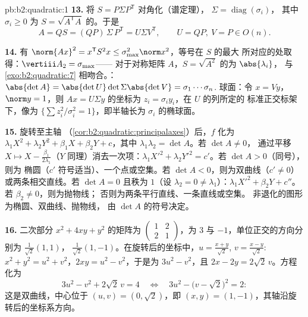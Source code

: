 \begin{solution}{pb:b2:quadratic:1}
\textbf{13.} 将 $S = P\Sigma P^{\mathsf T}$ 对角化（谱定理），
$\Sigma = \operatorname{diag}(\sigma_i)$，
其中 $\sigma_i \geq 0$ 为 $S =
\sqrt{A^{\mathsf T}A}$ 的。于是
\[
A = QS = (QP)\,\Sigma\,P^{\mathsf T} = U\Sigma V^{\mathsf T},
\qquad U = QP,\ V = P \in O(n) .
\]

\textbf{14.} 有 $\norm{Ax}^2 = x^{\mathsf T}S^2x \leq
\sigma_{\max}^2\norm x^2$，等号在 $S$ 的最大
所对应的处取得：$\vertiii A_2 = \sigma_{\max}$——
对于对称矩阵 $A$，$S = \sqrt{A^2}$ 的为 $\abs{\lambda_i}$，
与 \cref{exo:b2:quadratic:7} 相吻合。：$\abs{\det A} =
\abs{\det U}\det\Sigma\abs{\det V} = \sigma_1\cdots\sigma_n$.
球面：令 $x = Vy$，$\norm y = 1$，则 $Ax = U\Sigma y$
的坐标为 $z_i = \sigma_iy_i$，在 $U$ 的列所定的
标准正交标架下，像为 $\{\sum z_i^2/\sigma_i^2 =
1\}$，即半轴长为 $\sigma_i$ 的椭球面。

\textbf{15.} 旋转至主轴
（\cref{cor:b2:quadratic:principalaxes}）后，$f$ 化为
$\lambda_1X^2 + \lambda_2Y^2 + \beta_1X + \beta_2Y + c$，其中
$\lambda_1\lambda_2 = \det A$。若 $\det A \neq 0$，
通过平移 $X \mapsto X -
\frac{\beta_1}{2\lambda_1}$（$Y$ 同理）消去一次项：$\lambda_1X'^2
+ \lambda_2Y'^2 = c'$。若 $\det A > 0$（同号），则为
椭圆（$c'$ 符号适当）、一个点或空集。若 $\det
A < 0$，则为双曲线（$c' \neq 0$）或两条相交直线。若
$\det A = 0$ 且秩为 $1$（设 $\lambda_2 = 0 \neq
\lambda_1$）：$\lambda_1X'^2 + \beta_2Y + c''$。若 $\beta_2 \neq 0$，则为抛物线；
否则为两条平行直线、一条直线或空集。
非退化的图形为椭圆、双曲线、抛物线，
由 $\det A$ 的符号决定。

\textbf{16.} 二次部分 $x^2 + 4xy + y^2$ 的矩阵为
$\begin{pmatrix}1 & 2\\ 2 & 1\end{pmatrix}$，为 $3$
与 $-1$，单位正交的方向分别为 $\frac{1}{\sqrt2}(1,1)$，
$\frac{1}{\sqrt2}(1,-1)$。在旋转后的坐标中，$u =
\frac{x+y}{\sqrt2}$, $v = \frac{x-y}{\sqrt2}$: $x^2 + y^2 = u^2
+ v^2$，$2xy = u^2 - v^2$，于是为 $3u^2 - v^2$，且 $2x
- 2y = 2\sqrt2\,v$。方程化为
\[
3u^2 - v^2 + 2\sqrt2\,v = 4
\quad\Longleftrightarrow\quad
3u^2 - \bigl(v - \sqrt2\bigr)^2 = 2 :
\]
这是双曲线，中心位于 $(u, v) = (0, \sqrt2)$，即 $(x, y) =
(1, -1)$，其轴沿旋转后的坐标系方向。


\end{solution}
